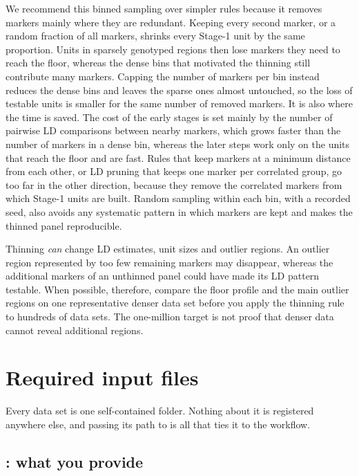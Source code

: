 \documentclass[11pt]{article}
\newcommand{\code}[1]{\texttt{\detokenize{#1}}}
\begin{document}
We recommend this binned sampling over simpler rules because it removes
markers mainly where they are redundant. Keeping every second marker, or a
random fraction of all markers, shrinks every Stage-1 unit by the same
proportion. Units in sparsely genotyped regions then lose markers they need
to reach the floor, whereas the dense bins that motivated the thinning still
contribute many markers. Capping the number of markers per bin instead
reduces the dense bins and leaves the sparse ones almost untouched, so the
loss of testable units is smaller for the same number of removed markers.
It is also where the time is saved. The cost of the early stages is set
mainly by the number of pairwise LD comparisons between nearby markers, which
grows faster than the number of markers in a dense bin, whereas the later
steps work only on the units that reach the floor and are fast.
Rules that keep markers at a minimum distance from each other, or LD pruning
that keeps one marker per correlated group, go too far in the other
direction, because they remove the correlated markers from which Stage-1
units are built. Random sampling within each bin, with a recorded seed, also
avoids any systematic pattern in which markers are kept and makes the
thinned panel reproducible.

Thinning \emph{can} change LD estimates, unit sizes and outlier regions. An
outlier region represented by too few remaining markers may disappear,
whereas the additional markers of an unthinned panel could have made its LD
pattern testable. When possible, therefore, compare the floor profile and
the main outlier regions on one representative denser data set before you
apply the thinning rule to hundreds of data sets. The one-million target is
not proof that denser data cannot reveal additional regions.

\section{Required input files}
\label{sec:dataset-contract}

Every data set is one self-contained folder. Nothing about it is registered
anywhere else, and passing its path to \code{run_dataset()} is all that ties
it to the workflow.

\subsection{\code{input/}: what you provide}
\end{document}
